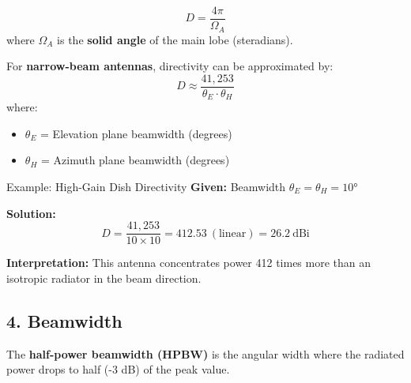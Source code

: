 \begin{equation}
D = \frac{4\pi}{\Omega_A}
\label{eq:directivity}
\end{equation}
where $\Omega_A$ is the \textbf{solid angle} of the main lobe (steradians).

For \textbf{narrow-beam antennas}, directivity can be approximated by:
\begin{equation}
D \approx \frac{41{,}253}{\theta_E \cdot \theta_H}
\label{eq:directivity-beamwidth}
\end{equation}
where:
\begin{itemize}
\item $\theta_E$ = Elevation plane beamwidth (degrees)
\item $\theta_H$ = Azimuth plane beamwidth (degrees)
\end{itemize}

\begin{calloutbox}{Example: High-Gain Dish Directivity}
\textbf{Given:} Beamwidth $\theta_E = \theta_H = 10°$

\textbf{Solution:}
\begin{equation}
D = \frac{41{,}253}{10 \times 10} = 412.53\ (\text{linear}) = 26.2\ \text{dBi}
\end{equation}

\textbf{Interpretation:} This antenna concentrates power 412 times more than an isotropic radiator in the beam direction.
\end{calloutbox}

\subsection{4. Beamwidth}

The \textbf{half-power beamwidth (HPBW)} is the angular width where the radiated power drops to half (-3 dB) of the peak value.

\begin{center}
\end{center}

